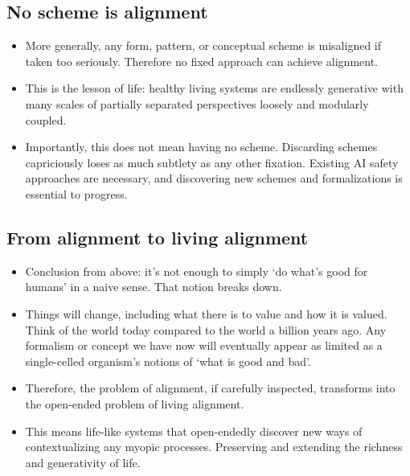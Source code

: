 \documentclass[11pt]{article}
\begin{document}
\subsection*{No scheme is alignment}
\begin{itemize}
  \item More generally, any form, pattern, or conceptual scheme is misaligned if taken too seriously. Therefore no fixed approach can achieve alignment. 
  \item This is the lesson of life: healthy living systems are endlessly generative with many scales of partially separated perspectives loosely and modularly coupled. 
  \item Importantly, this does not mean having no scheme. Discarding schemes capriciously loses as much subtlety as any other fixation. Existing AI safety approaches are necessary, and discovering new schemes and formalizations is essential to progress.
\end{itemize}


\subsection*{From alignment to living alignment}
\begin{itemize}
  \item Conclusion from above: it's not enough to simply `do what's good for humans' in a naive sense. That notion breaks down. 
  \item Things will change, including what there is to value and how it is valued. Think of the world today compared to the world a billion years ago. Any formalism or concept we have now will eventually appear as limited as a single-celled organism's notions of `what is good and bad'.
  \item Therefore, the problem of alignment, if carefully inspected, transforms into the open-ended problem of living alignment.
  \item This means life-like systems that open-endedly discover new ways of contextualizing any myopic processes. Preserving and extending the richness and generativity of life. 
\end{itemize}
\end{document}
